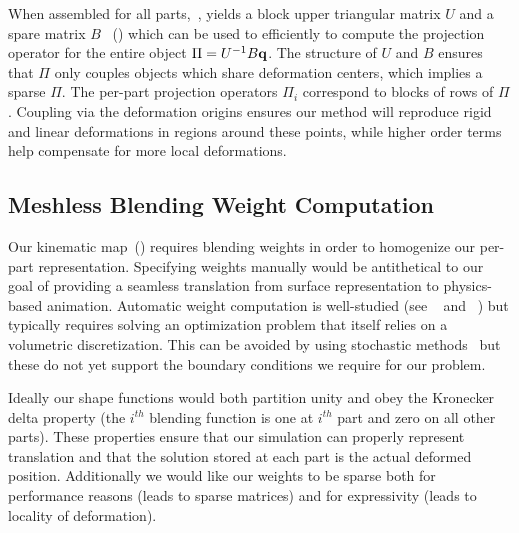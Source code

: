When assembled for all parts,~, yields a block upper triangular matrix $U$ and a spare matrix $B$ ~() which can be used to efficiently to compute the projection 
operator for the entire object $\Pi = U^{-1}B\mathbf{q}$. 
The structure of $U$ and $B$ ensures that $\Pi$ only couples objects which share deformation centers, which implies a sparse $\Pi$. 
The per-part projection operators $\Pi_i$ correspond to blocks of rows of $\Pi$. 
Coupling via the deformation origins ensures our method will reproduce rigid and linear deformations in regions around these points, while higher order 
terms help compensate for more local deformations.


\subsection{Meshless Blending Weight Computation}
\label{sec:weights}

Our kinematic map~() requires blending weights in order to homogenize our per-part representation. 
Specifying weights manually would be antithetical to our goal of providing a seamless translation from surface representation to physics-based animation.
Automatic  weight computation is well-studied (see ~\citet{10.1145/2766952,BBW:2011} and ~\citet{10.1145/2010324.1964968}) but typically requires solving 
an optimization problem that itself relies on a volumetric discretization. 
This can be avoided by using stochastic methods~\cite{Sawhney:2020:MCG} but these do not yet support the boundary conditions we require for our problem. 

Ideally our shape functions would both partition unity and obey the Kronecker delta property (the $i^{th}$ blending function is one at $i^{th}$ part and zero on all other parts).
These properties ensure that our simulation can properly represent translation and that the solution stored at each part is the actual deformed position.
Additionally we would like our weights to be sparse both for performance reasons (leads to sparse matrices) and for expressivity (leads to locality of deformation). 

